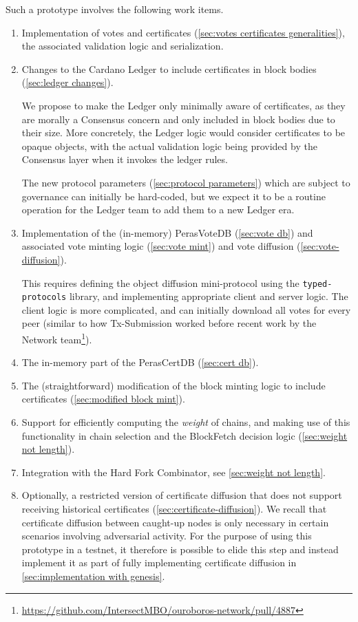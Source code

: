 Such a prototype involves the following work items.
\begin{enumerate}
\item\label{enumi:proto no certs:1}
  Implementation of votes and certificates (\cref{sec:votes certificates generalities}), the associated validation logic and serialization.
\item\label{enumi:proto no certs:2}
  Changes to the Cardano Ledger to include certificates in block bodies (\cref{sec:ledger changes}).

  We propose to make the Ledger only minimally aware of certificates, as they are morally a Consensus concern and only included in block bodies due to their size.
  More concretely, the Ledger logic would consider certificates to be opaque objects, with the actual validation logic being provided by the Consensus layer when it invokes the ledger rules.

  The new protocol parameters (\cref{sec:protocol parameters}) which are subject to governance can initially be hard-coded, but we expect it to be a routine operation for the Ledger team to add them to a new Ledger era.
\item\label{enumi:proto no certs:3}
  Implementation of the (in-memory) PerasVoteDB (\cref{sec:vote db}) and associated vote minting logic (\cref{sec:vote mint}) and vote diffusion (\cref{sec:vote-diffusion}).

  This requires defining the object diffusion mini-protocol using the \texttt{typed-protocols} library, and implementing appropriate client and server logic.
  The client logic is more complicated, and can initially download all votes for every peer (similar to how Tx-Submission worked before recent work by the Network team\footnote{\url{https://github.com/IntersectMBO/ouroboros-network/pull/4887}}).
\item\label{enumi:proto no certs:4}
  The in-memory part of the PerasCertDB (\cref{sec:cert db}).
\item\label{enumi:proto no certs:5}
  The (straightforward) modification of the block minting logic to include certificates (\cref{sec:modified block mint}).
\item\label{enumi:proto no certs:6}
  Support for efficiently computing the \emph{weight} of chains, and making use of this functionality in chain selection and the BlockFetch decision logic (\cref{sec:weight not length}).
\item\label{enumi:proto no certs:7}
  Integration with the Hard Fork Combinator, see \cref{sec:weight not length}.
\item\label{enumi:proto no certs:8}
  Optionally, a restricted version of certificate diffusion that does not support receiving historical certificates (\cref{sec:certificate-diffusion}).
  We recall that certificate diffusion between caught-up nodes is only necessary in certain scenarios involving adversarial activity.
  For the purpose of using this prototype in a testnet, it therefore is possible to elide this step and instead implement it as part of fully implementing certificate diffusion in \cref{sec:implementation with genesis}.
\end{enumerate}

